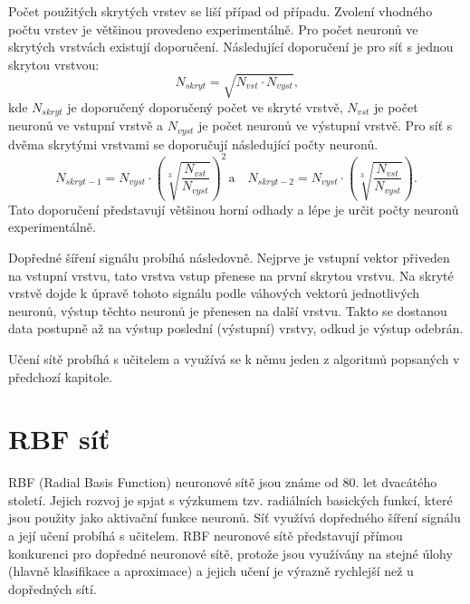 \documentclass[11pt,twoside,a4paper]{book}
\begin{document}
Počet použitých skrytých vrstev se liší případ od případu. Zvolení vhodného počtu vrstev je většinou provedeno experimentálně. Pro počet neuronů ve skrytých vrstvách existují doporučení. Následující doporučení je pro síť s jednou skrytou vrstvou:
\begin{equation}
N_{skryt}=\sqrt{N_{vst}\cdot N_{vyst}} \mbox{,}
\end{equation}
kde \begin{math}N_{skryt}\end{math} je doporučený doporučený počet ve skryté vrstvě, \begin{math}N_{vst}\end{math} je počet neuronů ve vstupní vrstvě a \begin{math}N_{vyst}\end{math} je počet neuronů ve výstupní vrstvě. Pro síť s dvěma skrytými vrstvami se doporučují následující počty neuronů.
\begin{equation}
N_{skryt-1}=N_{vyst}\cdot\left(\sqrt[3]{\frac{N_{vst}}{N_{vyst}}}\right)^{2} \,\mbox{a} \,\,\,\,\,\, N_{skryt-2}=N_{vyst}\cdot\left(\sqrt[3]{\frac{N_{vst}}{N_{vyst}}}\right)\mbox{.}
\end{equation}
Tato doporučení představují většinou horní odhady a lépe je určit počty neuronů experimentálně.\citep{skripta}

Dopředné šíření signálu probíhá následovně. Nejprve je vstupní vektor přiveden na vstupní vrstvu, tato vrstva vstup přenese na první skrytou vrstvu. Na skryté vrstvě dojde k úpravě tohoto signálu podle váhových vektorů jednotlivých neuronů, výstup těchto neuronů je přenesen na další vrstvu. Takto se dostanou data postupně až na výstup poslední (výstupní) vrstvy, odkud je výstup odebrán.

Učení sítě probíhá s učitelem a využívá se k němu jeden z algoritmů popsaných v předchozí kapitole.
\section{RBF síť}
RBF (Radial Basis Function) neuronové sítě jsou známe od 80. let dvacátého století. Jejich rozvoj je spjat s výzkumem tzv. radiálních basických funkcí, které jsou použity jako aktivační funkce neuronů. Síť využívá dopředného šíření signálu a její učení probíhá s učitelem. RBF neuronové sítě představují přímou konkurenci pro dopředné neuronové sítě, protože jsou využívány na stejné úlohy (hlavně klasifikace a aproximace) a jejich učení je výrazně rychlejší než u dopředných sítí.
\end{document}
